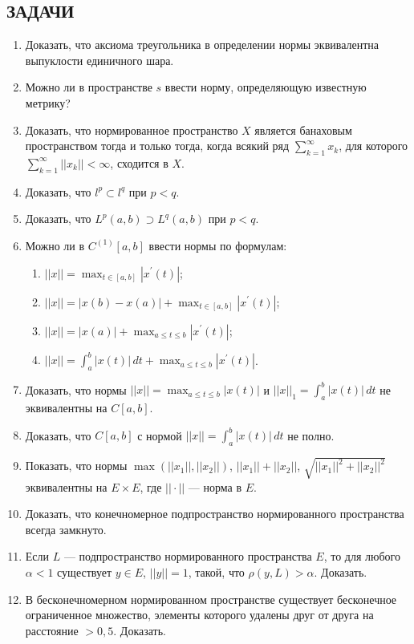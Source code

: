 \documentclass[12pt,a4paper]{article}
\begin{document}
\subsection*{ЗАДАЧИ}
\begin{enumerate}
\item Доказать, что аксиома треугольника в определении нормы эквивалентна выпуклости единичного шара.
\item Можно ли в пространстве $s$ ввести норму, определяющую известную метрику?
\item Доказать, что нормированное пространство $X$ является банаховым пространством тогда и только тогда, когда всякий ряд $\sum_{k=1}^{\infty}x_{k}$, для которого $\sum_{k=1}^{\infty}||x_{k}||<\infty$, сходится в $X$.
\item Доказать, что $l^{p}\subset l^{q}$ при $p<q$.
\item Доказать, что $L^{p}(a,b)\supset L^{q}(a,b)$ при $p<q$.
\item Можно ли в $C^{(1)}[a,b]$ ввести нормы по формулам:
\begin{enumerate}[label=\alph*)]
\item $||x||=\max_{t\in[a,b]}|x^{\prime}(t)|$;
\item $||x||=|x(b)-x(a)|+\max_{t\in[a,b]}|x^{\prime}(t)|$;
\item $||x||=|x(a)|+\max_{a\le t\le b}|x^{\prime}(t)|$;
\item $||x||=\int_{a}^{b}|x(t)| \, dt+\max_{a\le t\le b}|x^{\prime}(t)|$.
\end{enumerate}
\item Доказать, что нормы $||x||=\max_{a\le t\le b}|x(t)|$ и $||x||_{1}=\int_{a}^{b}|x(t)| \, dt$ не эквивалентны на $C[a,b]$.
\item Доказать, что $C[a,b]$ с нормой $||x||=\int_{a}^{b}|x(t)| \, dt$ не полно.
\item Показать, что нормы $\max(||x_{1}||,||x_{2}||)$, $||x_{1}||+||x_{2}||$, $\sqrt{||x_{1}||^{2}+||x_{2}||^{2}}$ эквивалентны на $E\times E$, где $|| \cdot ||$ — норма в $E$.
\item Доказать, что конечномерное подпространство нормированного пространства всегда замкнуто.
\item Если $L$ — подпространство нормированного пространства $E$, то для любого $\alpha<1$ существует $y\in E$, $||y||=1$, такой, что $\rho(y,L)>\alpha$. Доказать.
\item В бесконечномерном нормированном пространстве существует бесконечное ограниченное множество, элементы которого удалены друг от друга на расстояние $>0,5$. Доказать.\\

\end{enumerate}
\end{document}
